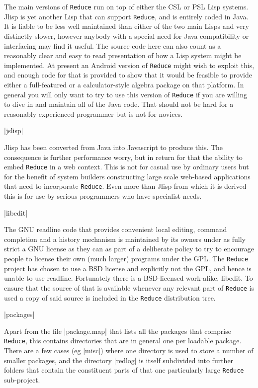 \documentclass[12pt,twoside,openright]{memoir}
\newcommand{\reduce}{\texttt{Reduce}\xspace}
\begin{document}
\begin{description}
The main versions of \reduce run on top of either the CSL or PSL Lisp systems.
Jlisp is yet another Lisp that can support \reduce, and is entirely coded in
Java. It is liable to be less well maintained than either of the two main
Lisps and very distinctly slower, however anybody with a special need for
Java compatibility or interfacing may find it useful. The source code here
can also count as a reasonably clear and easy to read presentation of how a
Lisp system might be implemented. At present an Android version of
\reduce might wish to exploit this, and enough code for that is provided
to show that it would be feasible to provide either a full-featured or
a calculator-style algebra package on that platform. In general you will
only want to try to use this version of \reduce if you are willing to dive
in and maintain all of the Java code. That should not be hard for a
reasonably experienced programmer but is not for novices.

\item |jslisp|

Jlisp has been converted from Java into Javascript to produce this. The
consequence is further performance worry, but in return for that the ability to
embed \reduce in a web context. This is not for casual use by ordinary users
but for the benefit of system builders constructing large scale web-based
applications that need to incorporate \reduce. Even more than Jlisp from
which it is derived this is for use by serious programmers who have specialist
needs.

\item |libedit|

  The GNU readline code that provides convenient local editing, command
  completion and a history mechanism is maintained by its owners under as fully
  strict a GNU license as they can as part of a deliberate policy to try to
  encourage people to license their own (much larger) programs under the
  GPL. The \reduce project has chosen to use a BSD license and explicitly not
  the GPL, and hence is unable to use readline. Fortunately there is a
  BSD-licensed work-alike, libedit. To ensure that the source of that is
  available whenever any relevant part of \reduce is used a copy of said source
  is included in the \reduce distribution tree.

\item |packages|

Apart from the file |package.map| that lists all the packages that
comprise \reduce, this contains directories that are in general one per
loadable package. There are a few cases (eg |misc|) where one directory
is used to store a number of smaller packages, and the directory
|redlog| is itself subdivided into further folders that contain the
constituent parts of that one particularly large \reduce sub-project.


\end{description}
\end{document}
